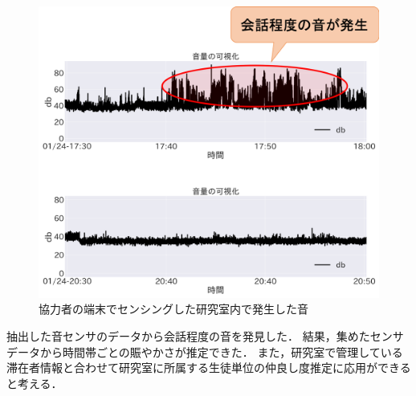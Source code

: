 \begin{figure}[tbh]
    \centering
    \includegraphics[width=16cm]{img_ex_case_2_audio.png}
    \caption{協力者の端末でセンシングした研究室内で発生した音}
    \label{fig:ex_case_2_audio}
\end{figure}

抽出した音センサのデータから会話程度の音を発見した．
結果，集めたセンサデータから時間帯ごとの賑やかさが推定できた．
また，研究室で管理している滞在者情報と合わせて研究室に所属する生徒単位の仲良し度推定に応用ができると考える．


